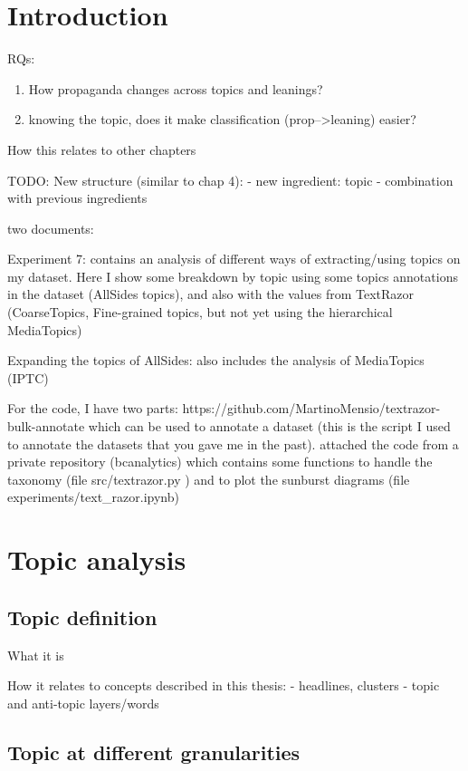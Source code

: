 \label{chap:topics}

\section{Introduction}
RQs:
\begin{enumerate}
    \item How propaganda changes across topics and leanings?
    \item knowing the topic, does it make classification (prop-->leaning) easier?
\end{enumerate}

How this relates to other chapters


TODO: New structure (similar to chap 4):
- new ingredient: topic
- combination with previous ingredients


two documents:

Experiment 7: contains an analysis of different ways of extracting/using topics on my dataset. Here I show some breakdown by topic using some topics annotations in the dataset (AllSides topics), and also with the values from TextRazor (CoarseTopics, Fine-grained topics, but not yet using the hierarchical MediaTopics)

Expanding the topics of AllSides: also includes the analysis of MediaTopics (IPTC)


For the code, I have two parts:
https://github.com/MartinoMensio/textrazor-bulk-annotate which can be used to annotate a dataset (this is the script I used to annotate the datasets that you gave me in the past).
attached the code from a private repository (bcanalytics) which contains some functions to handle the taxonomy (file src/textrazor.py ) and to plot the sunburst diagrams (file experiments/text\_razor.ipynb)

\section{Topic analysis}

\subsection{Topic definition}

What it is

How it relates to concepts described in this thesis:
- headlines, clusters
- topic and anti-topic layers/words

\subsection{Topic at different granularities}

